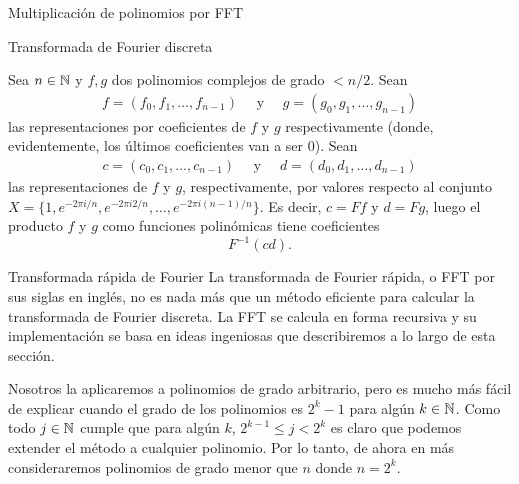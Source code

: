\begin{chapter}{Multiplicación de polinomios por FFT}
\begin{section}{Transformada de Fourier discreta}
\begin{ejemplo*}
      Sea $n \in \mathbb N$ y $f, g$ dos polinomios complejos de grado $< n/2$. Sean
      \begin{align*}
          f = (f_0, f_1, \ldots, f_{n-1}) \quad \text{ y } \quad g = (g_0, g_1, \ldots, g_{n-1})
      \end{align*}
      las representaciones por coeficientes de $f$ y $g$ respectivamente (donde, evidentemente, los últimos coeficientes van a ser $0$). Sean
      \begin{align*}
          c = (c_0, c_1, \ldots, c_{n-1}) \quad \text{ y } \quad d = (d_0, d_1, \ldots, d_{n-1})
      \end{align*}
      las representaciones de $f$ y $g$, respectivamente, por valores respecto al conjunto $X = \{1, e^{-2\pi i /{n}},e^{-2\pi i 2/{n}}, \ldots,e^{-2\pi i {(n-1)}/{n}} \}$. Es decir, $c = Ff$ y $d = Fg$,  luego el producto $f$ y $g$ como funciones polinómicas tiene coeficientes
      \begin{equation*}
           F^{-1}(cd).
      \end{equation*}
      \begin{comment}
      Observar que el hecho de que $F$ sea invertible y  que al aplicar transformada discreta de Fourier a un polinomio se obtiene una representación por valores del mismo, junto al teorema \ref{th-prod-convolucion-dft}, hacen que no sea necesario utilizar la proposición \ref{prop-mult-por-valor} para calcular el producto de dos polinomios utilizando la representación por valores.
      \end{comment}
  \end{ejemplo*}

 \end{section}

 \begin{section}{Transformada rápida de Fourier} La transformada de Fourier rápida, o FFT por sus siglas en inglés, no es nada más que un método eficiente para calcular la transformada de Fourier discreta. La FFT se calcula en forma recursiva y su implementación se basa en ideas ingeniosas que describiremos a lo largo de esta sección.

  Nosotros la aplicaremos a polinomios de grado arbitrario, pero es mucho más fácil de explicar cuando el grado de los polinomios es $2^k -1$  para algún $k \in \mathbb N$. Como todo $j \in \mathbb N$ cumple que para algún $k$, $2^{k-1} \le j < 2^k$ es claro que podemos extender el método a cualquier polinomio. Por lo tanto, de ahora en más consideraremos polinomios de grado menor que $n$ donde  $n = 2^k$.


\end{section}
\end{chapter}
